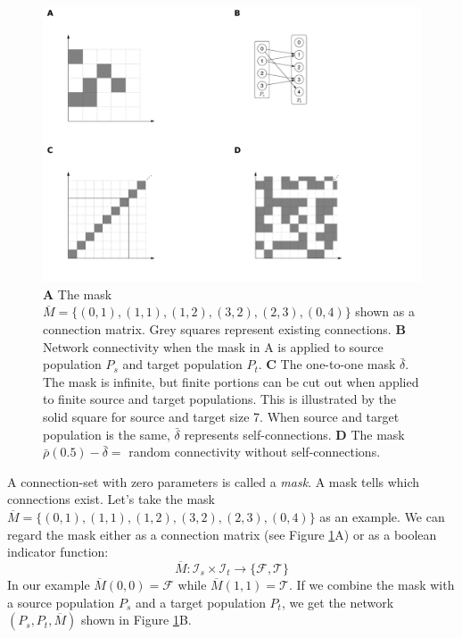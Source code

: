 \documentclass{frontiersSCNS} %
\begin{document}
\begin{figure}[ht]
\centering
\includegraphics[scale=.7]{figures/csa-pane.pdf}
\caption{
  \textbf{A} The mask $\overline{M} =
  \{(0,1), (1,1), (1,2), (3,2), (2,3), (0,4)\}$ shown as a connection
  matrix. Grey squares represent existing connections.
  \textbf{B} Network connectivity when the mask in A is applied to
  source population $P_s$ and target population
  $P_t$.
  \textbf{C} The one-to-one mask $\bar{\delta}$. The mask is infinite,
  but finite portions can be cut out when applied to finite source and
  target populations. This is illustrated by the solid square for
  source and target size 7. When source and target population is the
  same, $\bar{\delta}$ represents self-connections.
  \textbf{D} The mask $\bar{\rho}(0.5) - \bar{\delta} =$ random
  connectivity without self-connections.
}\label{fig:csa} 
\end{figure}

A connection-set with zero parameters is called a \emph{mask}. A mask
tells which connections exist.  Let's take the mask $\overline{M} =
\{(0,1), (1,1), (1,2), (3,2), (2,3), (0,4)\}$ as an example.  We can
regard the mask either as a connection matrix (see Figure
\ref{fig:csa}A) or as a boolean indicator function:
\begin{equation}
\overline{M} : \mathcal{I}_s \times \mathcal{I}_t \rightarrow \{ \mathcal{F},
\mathcal{T} \}
\end{equation}
In our example $\overline{M}(0,0) = \mathcal{F}$ while
$\overline{M}(1,1) = \mathcal{T}$. If we combine the mask with a
source population $P_s$ and a target population $P_t$, we get the
network $(P_s, P_t, \overline{M})$ shown in Figure \ref{fig:csa}B.
\end{document}
